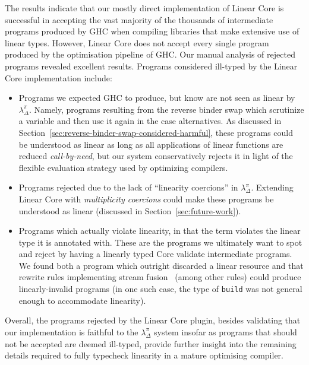 \documentclass[acmsmall,review,anonymous,screen]{acmart}
\begin{document}
{\small
  
  }
%
The results indicate that our mostly direct implementation of Linear Core is
successful in accepting the vast majority of the thousands of intermediate
programs produced by GHC when compiling libraries that make extensive use of
linear types.
%
However, Linear Core does not accept every single program produced by the
optimisation pipeline of GHC. Our manual analysis of rejected programs revealed
excellent results. Programs considered ill-typed by the Linear Core
implementation include:
%
\begin{itemize}
    \item Programs we expected GHC to produce, but know are not seen as linear by $\lambda^\pi_\Delta$.
        Namely, programs resulting from the reverse binder swap which
        scrutinize a variable and then use it again in the case alternatives.
        As discussed in Section~\ref{sec:reverse-binder-swap-considered-harmful}, these
        programs could be understood as linear as long as all applications of
        linear functions are reduced \emph{call-by-need}, but our system
        conservatively rejects it in light of the flexible evaluation strategy
        used by optimizing compilers.

    \item Programs rejected due to the lack of ``linearity coercions'' in
        $\lambda^\pi_\Delta$. Extending Linear Core with \emph{multiplicity coercions} 
        could make these programs be understood as linear
        (discussed in Section~\ref{sec:future-work}).

    \item Programs which actually violate linearity, in that the term
        violates the linear type it is annotated with. These are the programs
        we ultimately want to spot and reject by having a linearly typed Core
        validate intermediate programs. We found both a program which outright
        discarded a linear resource and that rewrite rules implementing stream
        fusion~\cite{10.1145/165180.165214,10.1145/1291151.1291199}
        (among other rules) could produce linearly-invalid programs (in one such case,
        the type of \lstinline{build} was not general enough to accommodate linearity).
\end{itemize}
%
Overall, the programs rejected by the Linear Core plugin,
besides validating that our implementation is faithful to the
$\lambda^\pi_\Delta$ system insofar as programs that should not be accepted
are deemed ill-typed, provide further insight into the remaining
details required to fully typecheck linearity in a mature optimising compiler.
\end{document}

